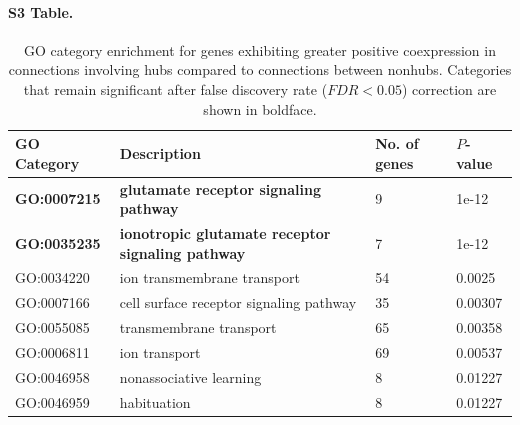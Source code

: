 \documentclass[10pt,letterpaper]{article}
\begin{document}
\paragraph*{S3 Table.}
\begin{table}[]
\centering
\caption{
GO category enrichment for genes exhibiting greater positive coexpression in connections involving hubs compared to connections between nonhubs.
Categories that remain significant after false discovery rate ($FDR < 0.05$) correction are shown in boldface.
}
\label{enrichmentRICH}
\begin{tabular}{llll}
\hline
\textbf{GO Category} & \textbf{Description}                                                                                               & \textbf{No. of genes} & \textbf{$P$-value} \\ \hline
\textbf{GO:0007215}          & \textbf{glutamate receptor signaling pathway}                                                                               & 9                 & 1e-12         \\
\textbf{GO:0035235}          & \textbf{ionotropic glutamate receptor signaling pathway}                                                                    & 7                 & 1e-12         \\
GO:0034220          & ion transmembrane transport                                                                                        & 54                & 0.0025        \\
GO:0007166          & cell surface receptor signaling pathway                                                                            & 35                & 0.00307       \\
GO:0055085          & transmembrane transport                                                                                            & 65                & 0.00358       \\
GO:0006811          & ion transport                                                                                                      & 69                & 0.00537       \\
GO:0046958          & nonassociative learning                                                                                            & 8                 & 0.01227       \\
GO:0046959          & habituation                                                                                                        & 8                 & 0.01227       \\

\end{tabular}
\end{table}
\end{document}
